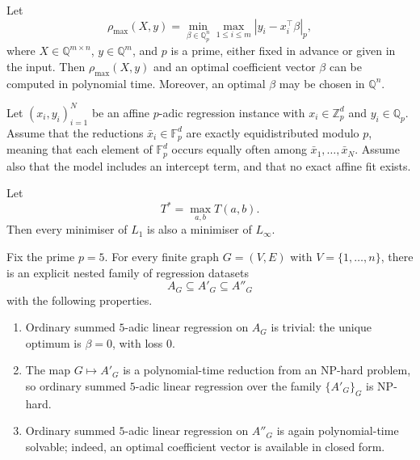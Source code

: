 
\begin{thm}\label{thm:max-polytime}
Let
\[
\rho_{\max}(X,y)
=
\min_{\beta\in\mathbb{Q}_p^n}
\max_{1\le i\le m}|y_i-x_i^\top\beta|_p,
\]
where $X\in\mathbb{Q}^{m\times n}$, $y\in\mathbb{Q}^m$, and $p$ is a prime,
either fixed in advance or given in the input. Then $\rho_{\max}(X,y)$ and an
optimal coefficient vector $\beta$ can be computed in polynomial time.
Moreover, an optimal $\beta$ may be chosen in $\mathbb{Q}^n$.
\end{thm}

\begin{thm}\label{thm:equidistributed-sum-refines-max}
Let $(x_i,y_i)_{i=1}^N$ be an affine $p$-adic regression instance with
$x_i\in\mathbb{Z}_p^d$ and $y_i\in\mathbb{Q}_p$. Assume that the reductions
$\bar{x}_i\in\mathbb{F}_p^d$ are exactly equidistributed modulo $p$, meaning
that each element of $\mathbb{F}_p^d$ occurs equally often among
$\bar{x}_1,\ldots,\bar{x}_N$. Assume also that the model includes an intercept
term, and that no exact affine fit exists.

Let
\[
T^*=\max_{a,b} T(a,b).
\]
Then every minimiser of $L_1$ is also a minimiser of $L_\infty$.
\end{thm}

\begin{thm}
\label{thm:nested-easy-hard-easy}
Fix the prime \(p=5\). For every finite graph \(G=(V,E)\) with
\(V=\{1,\dots,n\}\), there is an explicit nested family of regression datasets
\[
A_G \subseteq A'_G \subseteq A''_G
\]
with the following properties.

\begin{enumerate}
\item Ordinary summed \(5\)-adic linear regression on \(A_G\) is trivial: the
  unique optimum is \(\beta=0\), with loss \(0\).

\item The map \(G \mapsto A'_G\) is a polynomial-time reduction from an NP-hard
  problem, so ordinary summed \(5\)-adic linear regression over the family
  \(\{A'_G\}_G\) is NP-hard.

\item Ordinary summed \(5\)-adic linear regression on \(A''_G\) is again
  polynomial-time solvable; indeed, an optimal coefficient vector is available
  in closed form.
\end{enumerate}
\end{thm}
